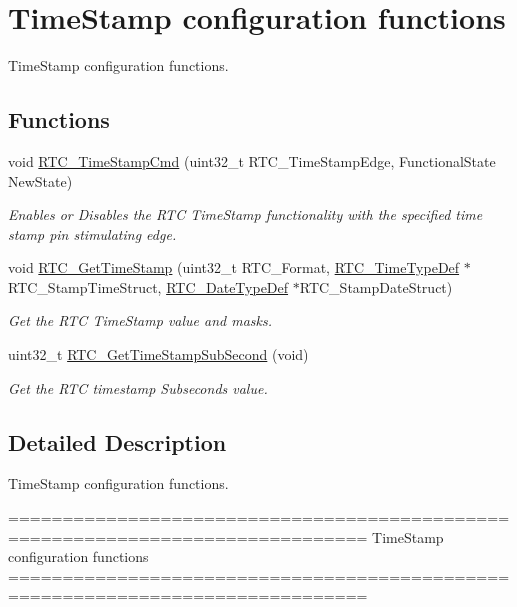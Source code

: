\hypertarget{group___r_t_c___group8}{\section{Time\-Stamp configuration functions}
\label{group___r_t_c___group8}
}


Time\-Stamp configuration functions.  


\subsection*{Functions}
\begin{DoxyCompactItemize}
\item 
void \hyperlink{group___r_t_c___group8_ga7d80fa4a2c87654598d8207154ac8e96}{R\-T\-C\-\_\-\-Time\-Stamp\-Cmd} (uint32\-\_\-t R\-T\-C\-\_\-\-Time\-Stamp\-Edge, Functional\-State New\-State)
\begin{DoxyCompactList}\small\item\em Enables or Disables the R\-T\-C Time\-Stamp functionality with the specified time stamp pin stimulating edge. \end{DoxyCompactList}\item 
void \hyperlink{group___r_t_c___group8_ga44c38b0c74e9e960a4263b2905f44796}{R\-T\-C\-\_\-\-Get\-Time\-Stamp} (uint32\-\_\-t R\-T\-C\-\_\-\-Format, \hyperlink{struct_r_t_c___time_type_def}{R\-T\-C\-\_\-\-Time\-Type\-Def} $\ast$R\-T\-C\-\_\-\-Stamp\-Time\-Struct, \hyperlink{struct_r_t_c___date_type_def}{R\-T\-C\-\_\-\-Date\-Type\-Def} $\ast$R\-T\-C\-\_\-\-Stamp\-Date\-Struct)
\begin{DoxyCompactList}\small\item\em Get the R\-T\-C Time\-Stamp value and masks. \end{DoxyCompactList}\item 
uint32\-\_\-t \hyperlink{group___r_t_c___group8_ga2b0ef81f4959a2f9fc6361fbda759b00}{R\-T\-C\-\_\-\-Get\-Time\-Stamp\-Sub\-Second} (void)
\begin{DoxyCompactList}\small\item\em Get the R\-T\-C timestamp Subseconds value. \end{DoxyCompactList}\end{DoxyCompactItemize}


\subsection{Detailed Description}
Time\-Stamp configuration functions. \begin{DoxyVerb} ===============================================================================
                       TimeStamp configuration functions
 ===============================================================================  \end{DoxyVerb}
 

